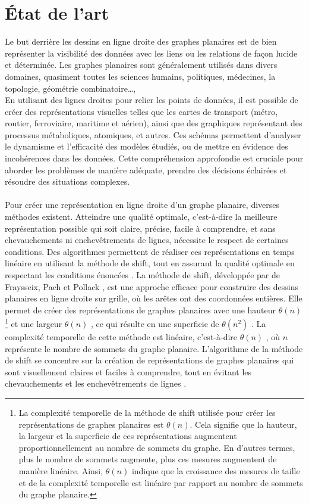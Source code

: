 \documentclass[hidelinks,letterpaper,12pt]{article}
\begin{document}
\section{État de l'art} 
Le but derrière les dessins en ligne droite des graphes planaires est de bien représenter la visibilité des données avec les liens ou les relations de façon lucide et déterminée. Les graphes planaires sont généralement utilisés dans divers domaines, quasiment toutes les sciences humains, politiques, médecines, la topologie, géométrie combinatoire…,
\\
En utilisant des lignes droites pour relier les points de données, il est possible de créer des représentations visuelles telles que les cartes de transport (métro, routier, ferroviaire, maritime et aérien), ainsi que des graphiques représentant des processus métaboliques, atomiques, et autres. Ces schémas permettent d'analyser le dynamisme et l'efficacité des modèles étudiés, ou de mettre en évidence des incohérences dans les données. Cette compréhension approfondie est cruciale pour aborder les problèmes de manière adéquate, prendre des décisions éclairées et résoudre des situations complexes.\\ \\ 
Pour créer une représentation en ligne droite d'un graphe planaire, diverses méthodes existent. Atteindre une qualité optimale, c'est-à-dire la meilleure représentation possible qui soit claire, précise, facile à comprendre, et sans chevauchements ni enchevêtrements de lignes, nécessite le respect de certaines conditions. Des algorithmes permettent de réaliser ces représentations en temps linéaire en utilisant la méthode de shift, tout en assurant la qualité optimale en respectant les conditions énoncées \citep{PhilippKindermann}. La méthode de shift, développée par de Fraysseix, Pach et Pollack  \citep{FraysseixPachPollack}, est une approche efficace pour construire des dessins planaires en ligne droite sur grille, où les arêtes ont des coordonnées entières. Elle permet de créer des représentations de graphes planaires avec une hauteur $\theta(n)$\footnote{La complexité temporelle de la méthode de shift utilisée pour créer les représentations de graphes planaires est $\theta(n)$. Cela signifie que la hauteur, la largeur et la superficie de ces représentations augmentent proportionnellement au nombre de sommets du graphe. En d'autres termes, plus le nombre de sommets augmente, plus ces mesures augmentent de manière linéaire. Ainsi, $\theta(n)$ indique que la croissance des mesures de taille et de la complexité temporelle est linéaire par rapport au nombre de sommets du graphe planaire.} et une largeur $\theta(n)$ , ce qui résulte en une superficie de $\theta(n^2)$ . La complexité temporelle de cette méthode est linéaire, c'est-à-dire $\theta(n)$ , où $n$ représente le nombre de sommets du graphe planaire. L'algorithme de la méthode de shift se concentre sur la création de représentations de graphes planaires qui sont visuellement claires et faciles à comprendre, tout en évitant les chevauchements et les enchevêtrements de lignes \citep{VismaraTamassia}.
\end{document}
